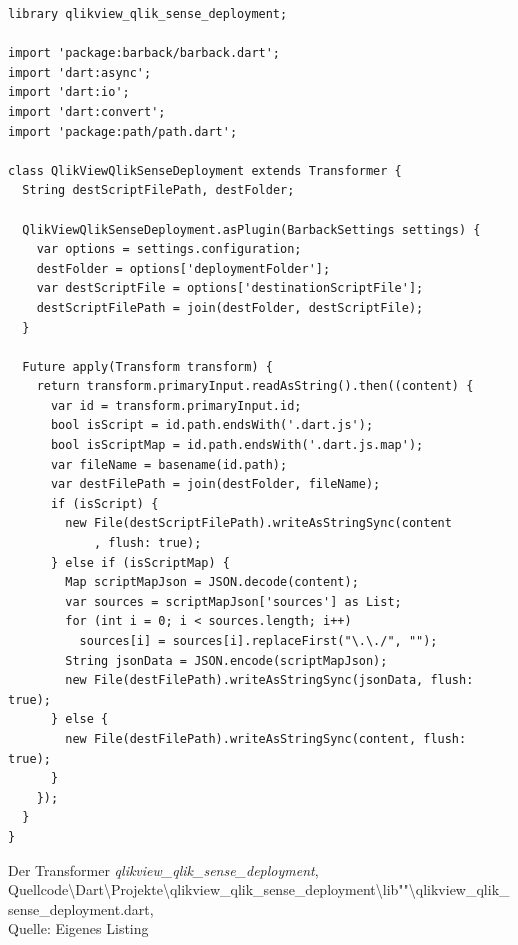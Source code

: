 \ifIncludeFigures\begin{listing}[htbp]
\begin{verbatim}
library qlikview_qlik_sense_deployment;

import 'package:barback/barback.dart';
import 'dart:async';
import 'dart:io';
import 'dart:convert';
import 'package:path/path.dart';

class QlikViewQlikSenseDeployment extends Transformer {
  String destScriptFilePath, destFolder;

  QlikViewQlikSenseDeployment.asPlugin(BarbackSettings settings) {
    var options = settings.configuration;
    destFolder = options['deploymentFolder'];
    var destScriptFile = options['destinationScriptFile'];
    destScriptFilePath = join(destFolder, destScriptFile);
  }

  Future apply(Transform transform) {
    return transform.primaryInput.readAsString().then((content) {
      var id = transform.primaryInput.id;
      bool isScript = id.path.endsWith('.dart.js');
      bool isScriptMap = id.path.endsWith('.dart.js.map');
      var fileName = basename(id.path);
      var destFilePath = join(destFolder, fileName);
      if (isScript) {
        new File(destScriptFilePath).writeAsStringSync(content
            , flush: true);
      } else if (isScriptMap) {
        Map scriptMapJson = JSON.decode(content);
        var sources = scriptMapJson['sources'] as List;
        for (int i = 0; i < sources.length; i++) 
          sources[i] = sources[i].replaceFirst("\.\./", "");
        String jsonData = JSON.encode(scriptMapJson);
        new File(destFilePath).writeAsStringSync(jsonData, flush: true);
      } else {
        new File(destFilePath).writeAsStringSync(content, flush: true);
      }
    });
  }
}
\end{verbatim}
\caption[Der Transformer \textit{qlikview\_qlik\_sense\_deployment}]{Der Transformer \textit{qlikview\_qlik\_sense\_deployment}, \\Quellcode\textbackslash{}Dart\textbackslash{}Projekte\textbackslash{}qlikview\_qlik\_sense\_deployment\textbackslash{}lib""\textbackslash{}qlikview\_qlik\_sense\_deployment.dart, \\Quelle: Eigenes Listing}
\label{lst:QlikviewQlikSenseDeployment}
\end{listing}\fi


